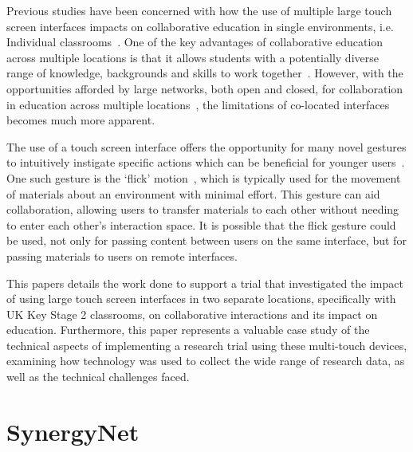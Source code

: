 \documentclass[a4paper,11pt]{article}
\begin{document}
Previous studies have been concerned with how the use of multiple large touch screen interfaces impacts on collaborative education in single environments, i.e. Individual classrooms~\cite{mohammed:2012,kreitmayer:2013,mercier:2015}.
One of the key advantages of collaborative education across multiple locations is that it allows students with a potentially diverse range of knowledge, backgrounds and skills to work together~\cite{kizilcec:2013}.
However, with the opportunities afforded by large networks, both open and closed, for collaboration in education across multiple locations~\cite{daradoumis:2000,mcconnell:2012}, the limitations of co-located interfaces becomes much more apparent.

The use of a touch screen interface offers the opportunity for many novel gestures to intuitively instigate specific actions which can be beneficial for younger users~\cite{kim:2007,wu:2003,rick:2009}.
One such gesture is the `flick' motion~\cite{reetz-et-al:2006}, which is typically used for the movement of materials about an environment with minimal effort.
This gesture can aid collaboration, allowing users to transfer materials to each other without needing to enter each other's interaction space.
 It is possible that the flick gesture could be used, not only for passing content between users on the same interface, but for passing materials to users on remote interfaces.

This papers details the work done to support a trial that investigated the impact of using large touch screen interfaces in two separate locations, specifically with UK Key Stage 2 classrooms, on collaborative interactions and its impact on education. 
Furthermore, this paper represents a valuable case study of the technical aspects of implementing a research trial using these multi-touch devices, examining how technology was used to collect the wide range of research data, as well as the technical challenges faced.


\section{SynergyNet}
\end{document}

